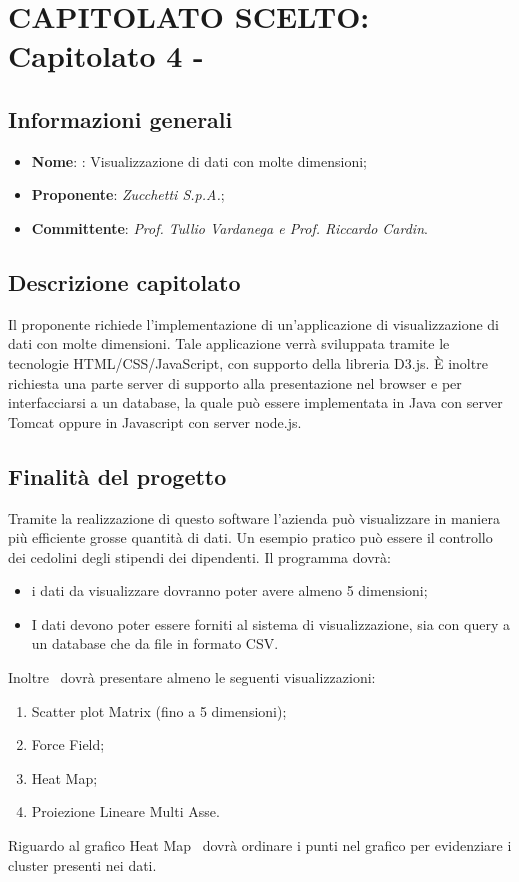 \section{CAPITOLATO SCELTO: Capitolato 4 - \hd}
\subsection{Informazioni generali}
\begin{itemize}
    \item \textbf{Nome}: \hd: Visualizzazione di dati con molte dimensioni;
    \item \textbf{Proponente}: \emph{Zucchetti S.p.A.};
    \item \textbf{Committente}: \emph{Prof. Tullio Vardanega e Prof. Riccardo Cardin}.
\end{itemize}
\subsection{Descrizione capitolato}
Il proponente richiede l'implementazione di un'applicazione di visualizzazione di dati con molte dimensioni. Tale applicazione verrà sviluppata tramite le tecnologie HTML/CSS/JavaScript, con supporto della libreria D3.js. È inoltre richiesta una parte server di supporto alla presentazione nel browser e per interfacciarsi a un  database, la quale può essere implementata in Java con server Tomcat oppure in Javascript con server node.js.
\subsection{Finalità del progetto}
Tramite la realizzazione di questo software l'azienda può visualizzare in maniera più efficiente grosse quantità di dati. Un esempio pratico può essere il controllo dei cedolini degli stipendi dei dipendenti. Il programma dovrà:
\begin{itemize}
    \item i dati da visualizzare dovranno poter avere almeno 5 dimensioni;
    \item I dati devono poter essere forniti al sistema di visualizzazione, sia con query a un database che da file in formato CSV.
\end{itemize}
Inoltre \hd\ dovrà presentare almeno le seguenti visualizzazioni:
\begin{enumerate}
	\item Scatter plot Matrix (fino a 5 dimensioni);
	\item Force Field;
	\item Heat Map;
	\item Proiezione Lineare Multi Asse.
\end{enumerate}
Riguardo al grafico Heat Map \hd\ dovrà ordinare i punti nel grafico per evidenziare i cluster presenti nei dati.
